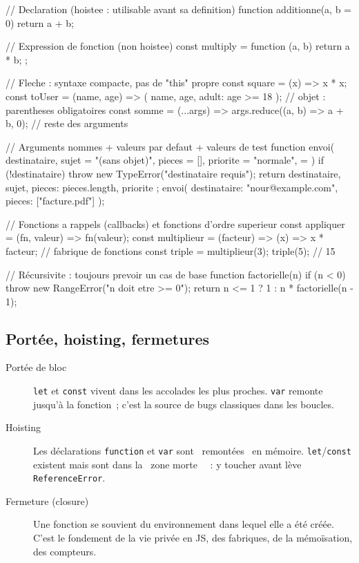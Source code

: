 \documentclass[12pt,a4paper,twoside,openright]{book}
\begin{document}
\begin{codejs}
// Declaration (hoistee : utilisable avant sa definition)
function additionne(a, b = 0) { return a + b; }

// Expression de fonction (non hoistee)
const multiply = function (a, b) { return a * b; };

// Fleche : syntaxe compacte, pas de "this" propre
const square = (x) => x * x;
const toUser = (name, age) => ({ name, age, adult: age >= 18 });  // objet : parentheses obligatoires
const somme = (...args) => args.reduce((a, b) => a + b, 0);       // reste des arguments

// Arguments nommes + valeurs par defaut + valeurs de test
function envoi({
  destinataire,
  sujet = "(sans objet)",
  pieces = [],
  priorite = "normale",
} = {}) {
  if (!destinataire) throw new TypeError("destinataire requis");
  return { destinataire, sujet, pieces: pieces.length, priorite };
}
envoi({ destinataire: "nour@example.com", pieces: ["facture.pdf"] });

// Fonctions a rappels (callbacks) et fonctions d'ordre superieur
const appliquer = (fn, valeur) => fn(valeur);
const multiplieur = (facteur) => (x) => x * facteur;   // fabrique de fonctions
const triple = multiplieur(3); triple(5);               // 15

// R\'ecursivite : toujours prevoir un cas de base
function factorielle(n) {
  if (n < 0) throw new RangeError("n doit etre >= 0");
  return n <= 1 ? 1 : n * factorielle(n - 1);
}
\end{codejs}

\subsection{Port\'ee, hoisting, fermetures}

\begin{description}
  \item[Port\'ee de bloc] \verb|let| et \verb|const| vivent dans les accolades les plus proches.
        \verb|var| remonte jusqu'\`a la fonction~; c'est la source de bugs classiques dans les boucles.
  \item[Hoisting] Les d\'eclarations \verb|function| et \verb|var| sont \og ~remont\'ees~ \fg{} en m\'emoire.
        \verb|let|/\verb|const| existent mais sont dans la \og ~zone morte~ \fg{}~: y toucher avant
        l\`eve \verb|ReferenceError|.
  \item[Fermeture (closure)] Une fonction se souvient du environnement dans lequel elle a \'et\'e
        cr\'e\'ee. C'est le fondement de la vie priv\'ee en JS, des fabriques, de la m\'emo\"isation,
        des compteurs.
\end{description}
\end{document}
